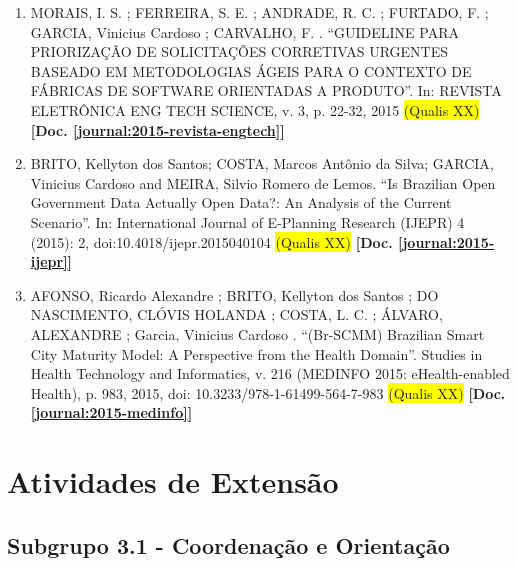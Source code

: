 \documentclass[a4paper,oneside,10pt]{article}
\begin{document}
\begin{enumerate}
\renewcommand{\labelenumi}{{\large\bfseries\arabic{enumi}.}}

\item MORAIS, I. S. ; FERREIRA, S. E. ; ANDRADE, R. C. ; FURTADO, F. ; GARCIA, Vinicius Cardoso ; CARVALHO, F. . ``GUIDELINE PARA PRIORIZAÇÃO DE SOLICITAÇÕES CORRETIVAS URGENTES BASEADO EM METODOLOGIAS ÁGEIS PARA O CONTEXTO DE FÁBRICAS DE SOFTWARE ORIENTADAS A PRODUTO''. In: REVISTA ELETRÔNICA ENG TECH SCIENCE, v. 3, p. 22-32, 2015 \colorbox{yellow}{(Qualis XX)} \textbf{[Doc. \ref{journal:2015-revista-engtech}]}

\item BRITO, Kellyton dos Santos; COSTA, Marcos Antônio da Silva; GARCIA, Vinicius Cardoso and MEIRA, Silvio Romero de Lemos. ``Is Brazilian Open Government Data Actually Open Data?: An Analysis of the Current Scenario''. In: International Journal of E-Planning Research (IJEPR) 4 (2015): 2, doi:10.4018/ijepr.2015040104 \colorbox{yellow}{(Qualis XX)} \textbf{[Doc. \ref{journal:2015-ijepr}]}

\item AFONSO, Ricardo Alexandre ; BRITO, Kellyton dos Santos ; DO NASCIMENTO, CLÓVIS HOLANDA ; COSTA, L.  C. ; ÁLVARO, ALEXANDRE ; Garcia, Vinicius Cardoso . ``(Br-SCMM) Brazilian Smart City Maturity Model: A Perspective from the Health Domain''. Studies in Health Technology and Informatics, v. 216 (MEDINFO 2015: eHealth-enabled Health), p. 983, 2015, doi: 10.3233/978-1-61499-564-7-983 \colorbox{yellow}{(Qualis XX)} \textbf{[Doc. \ref{journal:2015-medinfo}]}

\end{enumerate}

\newpage
\section{Atividades de Extens\~{a}o}

\subsection{Subgrupo 3.1 - Coordenação e Orientação}
\vspace{0.3cm}
\end{document}
